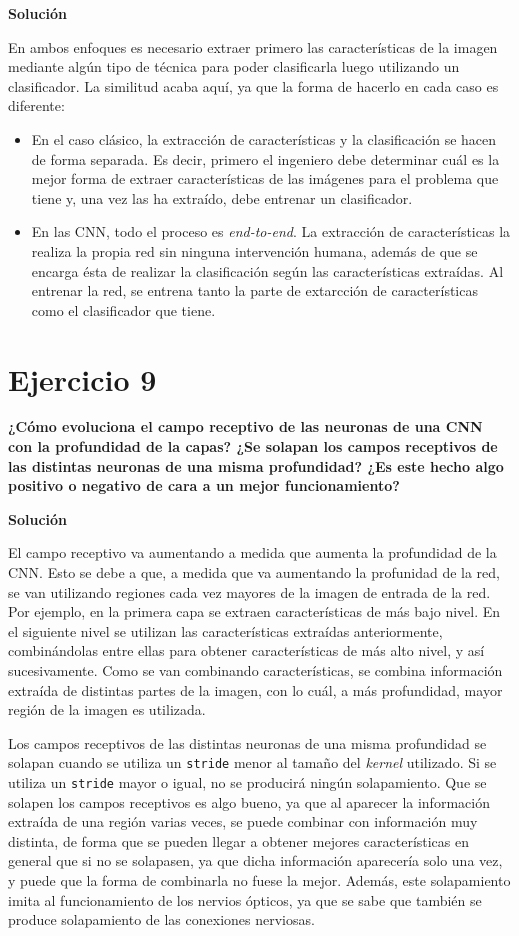 \documentclass[11pt,a4paper]{article}
\newcommand{\answer}{\noindent\textbf{Solución}}
\newcommand{\question}[1]{\noindent\textbf{#1}}
\newcommand{\nonumsection}[1]{\section*{#1}\addcontentsline{toc}{section}{#1}}
\begin{document}
\answer

En ambos enfoques es necesario extraer primero las características de
la imagen mediante algún tipo de técnica para poder clasificarla luego
utilizando un clasificador. La similitud acaba aquí, ya que
la forma de hacerlo en cada caso es diferente:

\begin{itemize}[label=\textbullet]
  \item En el caso clásico, la extracción de características y la
  clasificación se hacen de forma separada. Es decir, primero el ingeniero
  debe determinar cuál es la mejor forma de extraer características de las
  imágenes para el problema que tiene y, una vez las ha extraído, debe
  entrenar un clasificador.
  \item En las CNN, todo el proceso es \textit{end-to-end}. La extracción
  de características la realiza la propia red sin ninguna intervención humana,
  además de que se encarga ésta de realizar la clasificación según las características
  extraídas. Al entrenar la red, se entrena tanto la parte de extarcción
  de características como el clasificador que tiene.
\end{itemize}


\nonumsection{Ejercicio 9}

\question{¿Cómo evoluciona el campo receptivo de las neuronas de una CNN
con la profundidad de la capas? ¿Se solapan los campos receptivos de
las distintas neuronas de una misma profundidad? ¿Es este hecho algo
positivo o negativo de cara a un mejor funcionamiento?}

\answer

El campo receptivo va aumentando a medida que aumenta la profundidad de la
CNN. Esto se debe a que, a medida que va aumentando la profunidad de la red,
se van utilizando regiones cada vez mayores de la imagen de entrada de la red.
Por ejemplo, en la primera capa se extraen características de más bajo nivel. En
el siguiente nivel se utilizan las características extraídas anteriormente,
combinándolas entre ellas para obtener características de más alto nivel, y así
sucesivamente. Como se van combinando características, se combina información extraída
de distintas partes de la imagen, con lo cuál, a más profundidad, mayor región
de la imagen es utilizada.

Los campos receptivos de las distintas neuronas de una misma profundidad
se solapan cuando se utiliza un \texttt{stride} menor al tamaño del
\textit{kernel} utilizado. Si se utiliza un \texttt{stride} mayor o igual, no
se producirá ningún solapamiento. Que se solapen los campos receptivos es algo
bueno, ya que al aparecer la información extraída de una región varias veces,
se puede combinar con información muy distinta, de forma que se pueden llegar a
obtener mejores características en general que si no se solapasen, ya que dicha
información aparecería solo una vez, y puede que la forma de combinarla no fuese
la mejor. Además, este solapamiento imita al funcionamiento de los nervios ópticos,
ya que se sabe que también se produce solapamiento de las conexiones nerviosas.
\end{document}

